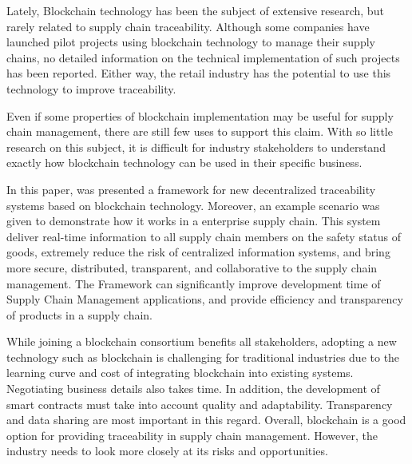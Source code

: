 \acresetall 
\label{chap:conclusion}

Lately, Blockchain technology has been the subject of extensive research, but rarely related to supply chain traceability. Although some companies have launched pilot projects using blockchain technology to manage their supply chains, no detailed information on the technical implementation of such projects has been reported. Either way, the retail industry has the potential to use this technology to improve traceability.

Even if some properties of blockchain implementation may be useful for supply chain management, there are still few uses to support this claim. With so little research on this subject, it is difficult for industry stakeholders to understand exactly how blockchain technology can be used in their specific business.

In this paper, was presented a framework for new decentralized traceability systems based on blockchain technology. Moreover, an example scenario was given to demonstrate how it works in a enterprise supply chain. This system deliver real-time information to all supply chain members on the safety status of goods, extremely reduce the risk of centralized information systems, and bring more secure, distributed, transparent, and collaborative to the supply chain management. The Framework can significantly improve development time of Supply Chain Management applications, and provide efficiency and transparency of products in a supply chain.

While joining a blockchain consortium benefits all stakeholders, adopting a new technology such as blockchain is challenging for traditional industries due to the learning curve and cost of integrating blockchain into existing systems. Negotiating business details also takes time. In addition, the development of smart contracts must take into account quality and adaptability. Transparency and data sharing are most important in this regard. Overall, blockchain is a good option for providing traceability in supply chain management. However, the industry needs to look more closely at its risks and opportunities.

